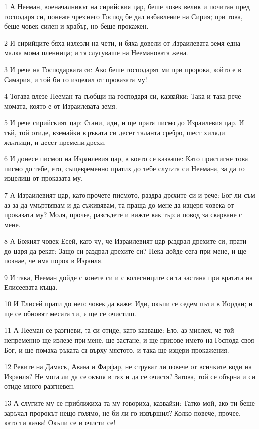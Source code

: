 \par 1 А Нееман, военачалникът на сирийския цар, беше човек велик и почитан пред господаря си, понеже чрез него Господ бе дал избавление на Сирия; при това, беше човек силен и храбър, но беше прокажен.
\par 2 И сирийците бяха излезли на чети, и бяха довели от Израилевата земя една малка мома пленница; и тя слугуваше на Неемановата жена.
\par 3 И рече на Господарката си: Ако беше господарят ми при пророка, който е в Самария, и той би го изцелил от проказата му!
\par 4 Тогава влезе Нееман та съобщи на господаря си, казвайки: Така и така рече момата, която е от Израилевата земя.
\par 5 И рече сирийският цар: Стани, иди, и ще пратя писмо до Израилевия цар. И тъй, той отиде, вземайки в ръката си десет таланта сребро, шест хиляди жълтици, и десет премени дрехи.
\par 6 И донесе писмоо на Израилевия цар, в което се казваше: Като пристигне това писмо до тебе, ето, същевременно пратих до тебе слугата си Неемана, за да го изцелиш от проказата му.
\par 7 А Израилевият цар, като прочете писмото, раздра дрехите си и рече: Бог ли съм аз за да умъртвявам и да съживявам, та праща до мене да изцеря човека от проказата му? Моля, прочее, разсъдете и вижте как търси повод за скарване с мене.
\par 8 А Божият човек Есей, като чу, че Израилевият цар раздрал дрехите си, прати до царя да рекат: Защо си раздрал дрехите си? Нека дойде сега при мене, и ще познае, че има порок в Израиля.
\par 9 И така, Нееман дойде с конете си и с колесниците си та застана при вратата на Елисеевата къща.
\par 10 И Елисей прати до него човек да каже: Иди, окъпи се седем пъти в Иордан; и ще се обновят месата ти, и ще се очистиш.
\par 11 А Нееман се разгневи, та си отиде, като казваше: Ето, аз мислех, че той непременно ще излезе при мене, ще застане, и ще призове името на Господа своя Бог, и ще помаха ръката си върху мястото, и така ще изцери прокажения.
\par 12 Реките на Дамаск, Авана и Фарфар, не струват ли повече от всичките води на Израиля? Не мога ли да се окъпя в тях и да се очистя? Затова, той се обърна и си отиде много разгневен.
\par 13 А слугите му се приближиха та му говориха, казвайки: Татко мой, ако ти беше заръчал пророкът нещо голямо, не би ли го извършил? Колко повече, прочее, като ти казва! Окъпи се и очисти се!
